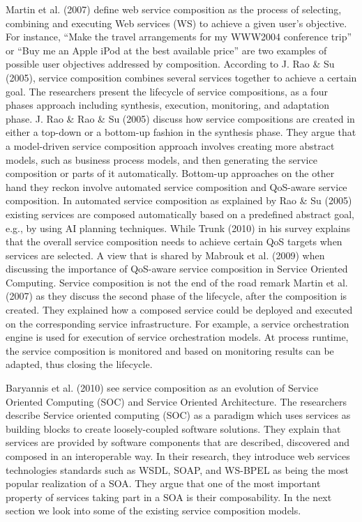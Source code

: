 \documentclass{article}
\begin{document}
Martin et al. (2007) define web service composition as the process of selecting, combining and executing Web services (WS) to achieve a given user’s objective. For instance, “Make the travel arrangements for my WWW2004 conference trip” or “Buy me an Apple iPod at the best available price” are two examples of possible user objectives addressed by composition. According to J. Rao \& Su (2005), service composition combines several services together to achieve a certain goal. The researchers present the lifecycle of service compositions, as a four phases approach including synthesis, execution, monitoring, and adaptation phase. J. Rao \& Rao \& Su (2005) discuss how service compositions are created in either a top-down or a bottom-up fashion in the synthesis phase. They argue that a model-driven service composition approach involves creating more abstract models, such as business process models, and then generating the service composition or parts of it automatically. Bottom-up approaches on the other hand they reckon involve automated service composition and QoS-aware service composition. In automated service composition as explained by Rao \& Su (2005) existing services are composed automatically based on a predefined abstract goal, e.g., by using AI planning techniques. While Trunk (2010) in his survey explains that the overall service composition needs to achieve certain QoS targets when services are selected. A view that is shared by Mabrouk et al. (2009) when discussing the importance of QoS-aware service composition in Service Oriented Computing. Service composition is not the end of the road remark Martin et al. (2007) as they discuss the second phase of the lifecycle, after the composition is created. They explained how a composed service could be deployed and executed on the corresponding service infrastructure. For example, a service orchestration engine is used for execution of service orchestration models. At process runtime, the service composition is monitored and based on monitoring results can be adapted, thus closing the lifecycle. 

Baryannis et al. (2010) see service composition as an evolution of Service Oriented Computing (SOC) and Service Oriented Architecture. The researchers describe Service oriented computing (SOC) as a paradigm which uses services as building blocks to create loosely-coupled software solutions. They explain that services are provided by software components that are described, discovered and composed in an interoperable way. In their research, they introduce web services technologies standards such as WSDL, SOAP, and WS-BPEL as being the most popular realization of a SOA. They argue that one of the most important property of services taking part in a SOA is their composability. In the next section we look into some of the existing service composition models.
\end{document}
